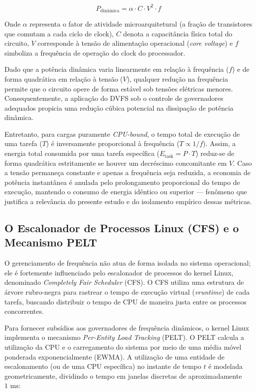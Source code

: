 \documentclass[12pt]{article}
\begin{document}
\begin{equation}
P_{\text{dinâmica}} = \alpha \cdot C \cdot V^2 \cdot f
\end{equation}

Onde $\alpha$ representa o fator de atividade microarquitetural (a fração de transistores que comutam a cada ciclo de clock), $C$ denota a capacitância física total do circuito, $V$ corresponde à tensão de alimentação operacional (\textit{core voltage}) e $f$ simboliza a frequência de operação do clock do processador.

Dado que a potência dinâmica varia linearmente em relação à frequência ($f$) e de forma quadrática em relação à tensão ($V$), qualquer redução na frequência permite que o circuito opere de forma estável sob tensões elétricas menores. Consequentemente, a aplicação do DVFS sob o controle de governadores adequados propicia uma redução cúbica potencial na dissipação de potência dinâmica. 

Entretanto, para cargas puramente \textit{CPU-bound}, o tempo total de execução de uma tarefa ($T$) é inversamente proporcional à frequência ($T \propto 1/f$). Assim, a energia total consumida por uma tarefa específica ($E_{\text{task}} = P \cdot T$) reduz-se de forma quadrática estritamente se houver um decréscimo concomitante em $V$. Caso a tensão permaneça constante e apenas a frequência seja reduzida, a economia de potência instantânea é anulada pelo prolongamento proporcional do tempo de execução, mantendo o consumo de energia idêntico ou superior — fenômeno que justifica a relevância do presente estudo e do isolamento empírico dessas métricas.

\subsection{O Escalonador de Processos Linux (CFS) e o Mecanismo PELT}

O gerenciamento de frequência não atua de forma isolada no sistema operacional; ele é fortemente influenciado pelo escalonador de processos do kernel Linux, denominado \textit{Completely Fair Scheduler} (CFS). O CFS utiliza uma estrutura de árvore rubro-negra para rastrear o tempo de execução virtual (\textit{vruntime}) de cada tarefa, buscando distribuir o tempo de CPU de maneira justa entre os processos concorrentes.

Para fornecer subsídios aos governadores de frequência dinâmicos, o kernel Linux implementa o mecanismo \textit{Per-Entity Load Tracking} (PELT). O PELT calcula a utilização da CPU e o carregamento do sistema por meio de uma média móvel ponderada exponencialmente (EWMA). A utilização de uma entidade de escalonamento (ou de uma CPU específica) no instante de tempo $t$ é modelada geometricamente, dividindo o tempo em janelas discretas de aproximadamente $1\text{ ms}$:
\end{document}
